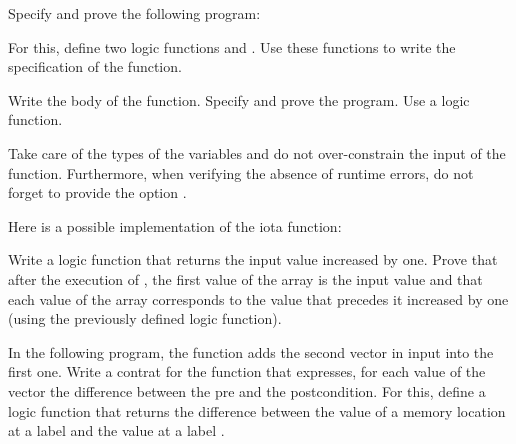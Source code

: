 




Specify and prove the following program:






For this, define two logic functions  and .
Use these functions to write the specification of the function.





Write the body of the  function. Specify and prove the
program. Use a  logic function.




Take care of the types of the variables and do not over-constrain the input of
the function. Furthermore, when verifying the absence of runtime errors, do not
forget to provide the option .




Here is a possible implementation of the iota function:




Write a logic function that returns the input value increased by one. Prove
that after the execution of , the first value of the array is
the input value and that each value of the array corresponds to the value that
precedes it increased by one (using the previously defined logic function).






In the following program, the  function adds the second
vector in input into the first one. Write a contrat for the function
 that expresses, for each value of the vector
 the difference between the pre and the postcondition. For this,
define a logic function  that returns the difference between
the value of a memory location at a label  and the value at a
label .





